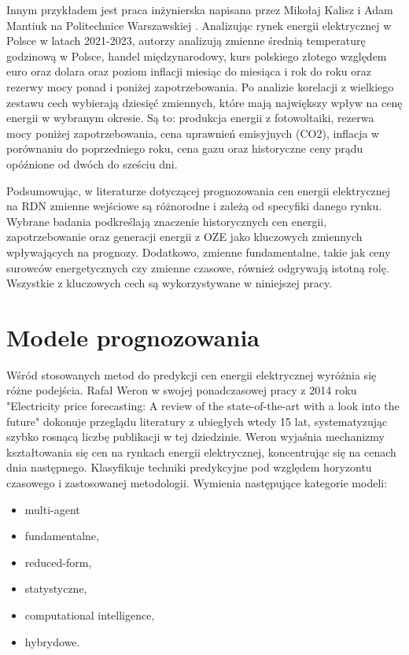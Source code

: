 Innym przykładem jest praca inżynierska napisana przez Mikołaj Kalisz i Adam Mantiuk na Politechnice Warszawskiej \cite{MGR2025}. Analizując rynek energii elektrycznej w Polsce w latach 2021-2023, autorzy analizują zmienne średnią temperaturę godzinową w Polsce, handel międzynarodowy, kurs polskiego złotego względem euro oraz dolara oraz poziom inflacji miesiąc do miesiąca i rok do roku oraz rezerwy mocy ponad i poniżej zapotrzebowania. Po analizie korelacji z wielkiego zestawu cech wybierają dziesięć zmiennych, które mają największy wpływ na cenę energii w wybranym okresie. Są to: produkcja energii z fotowoltaiki, rezerwa mocy poniżej zapotrzebowania, cena uprawnień emisyjnych (CO2), inflacja w porównaniu do poprzedniego roku, cena gazu oraz historyczne ceny prądu opóźnione od dwóch do sześciu dni. 

Podsumowując, w literaturze dotyczącej prognozowania cen energii elektrycznej na RDN zmienne wejściowe są różnorodne i zależą od specyfiki danego rynku. Wybrane badania podkreślają znaczenie historycznych cen energii, zapotrzebowanie  oraz generacji energii z OZE jako kluczowych zmiennych wpływających na prognozy. Dodatkowo, zmienne fundamentalne, takie jak ceny surowców energetycznych czy zmienne czasowe, również odgrywają istotną rolę. Wszystkie z kluczowych cech są wykorzystywane w niniejszej pracy.

\section{Modele prognozowania}
\label{sec:modele_prognozowania_literatura}

Wśród stosowanych metod do predykcji cen energii elektrycznej wyróżnia się różne podejścia. Rafał Weron w swojej ponadczasowej pracy z 2014 roku "Electricity price forecasting: A review of the state-of-the-art with a look into the future" \cite{WERON20141030} dokonuje przeglądu literatury z ubiegłych wtedy 15 lat, systematyzując szybko rosnącą liczbę publikacji w tej dziedzinie. Weron wyjaśnia mechanizmy kształtowania się cen na rynkach energii elektrycznej, koncentrując się na cenach dnia następnego. Klasyfikuje techniki predykcyjne pod względem horyzontu czasowego i zastosowanej metodologii. Wymienia następujące kategorie modeli: 
\begin{itemize}
    \item multi-agent
    \item fundamentalne,
    \item reduced-form,
    \item statystyczne,
    \item computational intelligence,
    \item hybrydowe.
\end{itemize}

